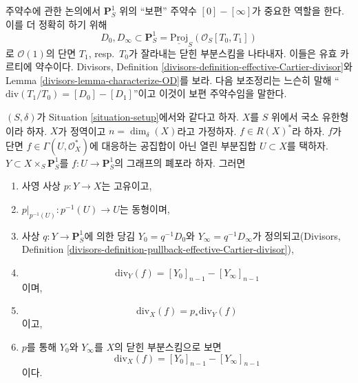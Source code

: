\noindent
주약수에 관한 논의에서 $\mathbf{P}^1_S$ 위의 “보편” 주약수
$[0] - [\infty]$가 중요한 역할을 한다. 이를 더 정확히 하기 위해
\begin{equation}
\label{equation-zero-infty}
D_0, D_\infty \subset
\mathbf{P}^1_S = \underline{\text{Proj}}_S(\mathcal{O}_S[T_0, T_1])
\end{equation}
로 $\mathcal{O}(1)$의 단면 $T_1$, resp.\ $T_0$가 잘라내는 닫힌
부분스킴을 나타내자. 이들은 유효 카르티에 약수이다. Divisors,
Definition \ref{divisors-definition-effective-Cartier-divisor}와 Lemma
\ref{divisors-lemma-characterize-OD}를 보라. 다음 보조정리는 느슨히
말해 “$\text{div}(T_1/T_0) = [D_0] - [D_1]$”이고 이것이 보편
주약수임을 말한다.

\begin{lemma}
\label{lemma-rational-function}
$(S, \delta)$가 Situation \ref{situation-setup}에서와 같다고 하자.
$X$를 $S$ 위에서 국소 유한형이라 하자. $X$가 정역이고
$n = \dim_\delta(X)$라고 가정하자. $f \in R(X)^*$라 하자.
$f$가 단면 $f \in \Gamma(U, \mathcal{O}_X^*)$에 대응하는 공집합이 아닌
열린 부분집합 $U \subset X$를 택하자.
$Y \subset X \times_S \mathbf{P}^1_S$를
$f : U \to \mathbf{P}^1_S$의 그래프의 폐포라 하자.
그러면
\begin{enumerate}
\item 사영 사상 $p : Y \to X$는 고유이고,
\item $p|_{p^{-1}(U)} : p^{-1}(U) \to U$는 동형이며,
\item 사상 $q : Y \to \mathbf{P}^1_S$에 의한 당김
$Y_0 = q^{-1}D_0$와 $Y_\infty = q^{-1}D_\infty$가 정의되고(Divisors,
Definition \ref{divisors-definition-pullback-effective-Cartier-divisor}),
\item
$$
\text{div}_Y(f) = [Y_0]_{n - 1} - [Y_\infty]_{n - 1}
$$
이며,
\item
$$
\text{div}_X(f) = p_*\text{div}_Y(f)
$$
이고,
\item $p$를 통해 $Y_0$와 $Y_\infty$를 $X$의 닫힌 부분스킴으로 보면
$$
\text{div}_X(f) = [Y_0]_{n - 1} - [Y_\infty]_{n - 1}
$$
이다.
\end{enumerate}
\end{lemma}

